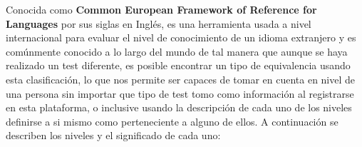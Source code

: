 Conocida como \textbf{Common European Framework of Reference for Languages} por sus siglas en Inglés, es una herramienta usada a nivel internacional para evaluar el nivel de conocimiento de un idioma extranjero y es comúnmente conocido a lo largo del mundo de tal manera que aunque se haya realizado un test diferente, es posible encontrar un tipo de equivalencia usando esta clasificación, lo que nos permite ser capaces de tomar en cuenta en nivel de una persona sin importar que tipo de test tomo como información al registrarse en esta plataforma, o inclusive usando la descripción de cada uno de los niveles definirse a si mismo como perteneciente a alguno de ellos.
A continuación se describen los niveles y el significado de cada uno:



